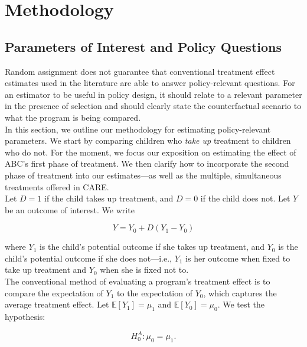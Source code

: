 \section{Methodology} \label{section:methodology}

\subsection{Parameters of Interest and Policy Questions} \label{section:methodsquestions}

\noindent Random assignment does not guarantee that conventional treatment effect estimates used in the literature are able to answer policy-relevant questions. For an estimator to be useful in policy design, it should relate to a relevant parameter in the presence of selection and should clearly state the counterfactual scenario to what the program is being compared.\\

\noindent In this section, we outline our methodology for estimating policy-relevant parameters. We start by comparing children who \textit{take up} treatment to children who do not. For the moment, we focus our exposition on estimating the effect of ABC's first phase of treatment. We then clarify how to incorporate the second phase of treatment into our estimates---as well as the multiple, simultaneous treatments offered in CARE.\\

\noindent Let $D = 1$ if the child takes up treatment, and $D=0$ if the child does not. Let $Y$ be an outcome of interest. We write

\begin{equation}
Y = Y_{0} + D \left( Y_{1} - Y_{0} \right) \label{eq:outcome}
\end{equation}

\noindent where $Y_{1}$ is the child's potential outcome if she takes up treatment, and $Y_{0}$ is the child's potential outcome if she does not---i.e., $Y_{1}$ is her outcome when fixed to take up treatment and $Y_{0}$ when she is fixed not to.\\

\noindent The conventional method of evaluating a program's treatment effect is to compare the expectation of $Y_{1}$ to the expectation of $Y_{0}$, which captures the average treatment effect. Let $\mathbb{E} \left[ Y_{1} \right] = \mu_{1}$ and $\mathbb{E} \left[ Y_{0} \right] = \mu_{0}$. We test the hypothesis:

\begin{equation}
H_{0}^A: \mu_{0} = \mu_{1}. \label{eq:ho}
\end{equation}

